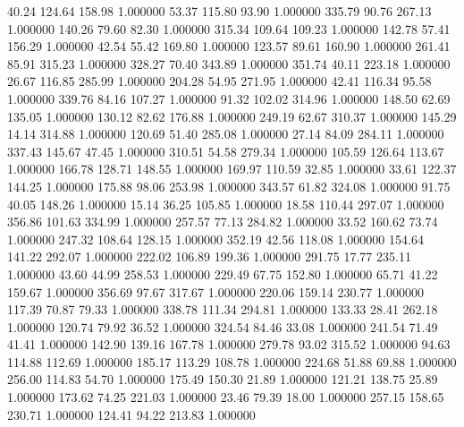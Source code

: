      40.24    124.64    158.98  1.000000
     53.37    115.80     93.90  1.000000
    335.79     90.76    267.13  1.000000
    140.26     79.60     82.30  1.000000
    315.34    109.64    109.23  1.000000
    142.78     57.41    156.29  1.000000
     42.54     55.42    169.80  1.000000
    123.57     89.61    160.90  1.000000
    261.41     85.91    315.23  1.000000
    328.27     70.40    343.89  1.000000
    351.74     40.11    223.18  1.000000
     26.67    116.85    285.99  1.000000
    204.28     54.95    271.95  1.000000
     42.41    116.34     95.58  1.000000
    339.76     84.16    107.27  1.000000
     91.32    102.02    314.96  1.000000
    148.50     62.69    135.05  1.000000
    130.12     82.62    176.88  1.000000
    249.19     62.67    310.37  1.000000
    145.29     14.14    314.88  1.000000
    120.69     51.40    285.08  1.000000
     27.14     84.09    284.11  1.000000
    337.43    145.67     47.45  1.000000
    310.51     54.58    279.34  1.000000
    105.59    126.64    113.67  1.000000
    166.78    128.71    148.55  1.000000
    169.97    110.59     32.85  1.000000
     33.61    122.37    144.25  1.000000
    175.88     98.06    253.98  1.000000
    343.57     61.82    324.08  1.000000
     91.75     40.05    148.26  1.000000
     15.14     36.25    105.85  1.000000
     18.58    110.44    297.07  1.000000
    356.86    101.63    334.99  1.000000
    257.57     77.13    284.82  1.000000
     33.52    160.62     73.74  1.000000
    247.32    108.64    128.15  1.000000
    352.19     42.56    118.08  1.000000
    154.64    141.22    292.07  1.000000
    222.02    106.89    199.36  1.000000
    291.75     17.77    235.11  1.000000
     43.60     44.99    258.53  1.000000
    229.49     67.75    152.80  1.000000
     65.71     41.22    159.67  1.000000
    356.69     97.67    317.67  1.000000
    220.06    159.14    230.77  1.000000
    117.39     70.87     79.33  1.000000
    338.78    111.34    294.81  1.000000
    133.33     28.41    262.18  1.000000
    120.74     79.92     36.52  1.000000
    324.54     84.46     33.08  1.000000
    241.54     71.49     41.41  1.000000
    142.90    139.16    167.78  1.000000
    279.78     93.02    315.52  1.000000
     94.63    114.88    112.69  1.000000
    185.17    113.29    108.78  1.000000
    224.68     51.88     69.88  1.000000
    256.00    114.83     54.70  1.000000
    175.49    150.30     21.89  1.000000
    121.21    138.75     25.89  1.000000
    173.62     74.25    221.03  1.000000
     23.46     79.39     18.00  1.000000
    257.15    158.65    230.71  1.000000
    124.41     94.22    213.83  1.000000
